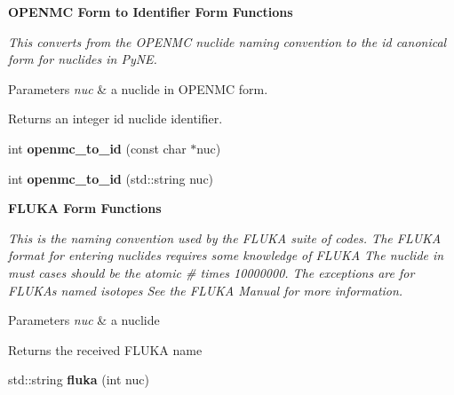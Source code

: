 \begin{Indent}\textbf{ O\+P\+E\+N\+MC Form to Identifier Form Functions}\par
{\em This converts from the O\+P\+E\+N\+MC nuclide naming convention to the id canonical form for nuclides in Py\+NE. 
\begin{DoxyParams}{Parameters}
{\em nuc} & a nuclide in O\+P\+E\+N\+MC form. \\
\hline
\end{DoxyParams}
\begin{DoxyReturn}{Returns}
an integer id nuclide identifier. 
\end{DoxyReturn}
}\begin{DoxyCompactItemize}
\item 
\mbox{\label{namespacepyne_1_1nucname_a716f20f33139efd693be4c8f394fbaa1}} 
int {\bfseries openmc\+\_\+to\+\_\+id} (const char $\ast$nuc)
\item 
\mbox{\label{namespacepyne_1_1nucname_a74d4da409e380e2bf13e36e26eff433a}} 
int {\bfseries openmc\+\_\+to\+\_\+id} (std\+::string nuc)
\end{DoxyCompactItemize}
\end{Indent}
\begin{Indent}\textbf{ F\+L\+U\+KA Form Functions}\par
{\em This is the naming convention used by the F\+L\+U\+KA suite of codes. The F\+L\+U\+KA format for entering nuclides requires some knowledge of F\+L\+U\+KA The nuclide in must cases should be the atomic \# times 10000000. The exceptions are for F\+L\+U\+KA\textquotesingle{}s named isotopes See the F\+L\+U\+KA Manual for more information. 
\begin{DoxyParams}{Parameters}
{\em nuc} & a nuclide \\
\hline
\end{DoxyParams}
\begin{DoxyReturn}{Returns}
the received F\+L\+U\+KA name 
\end{DoxyReturn}
}\begin{DoxyCompactItemize}
\item 
\mbox{\label{namespacepyne_1_1nucname_ac34443f2c05ca8fda7d7993e715a3f5a}} 
std\+::string {\bfseries fluka} (int nuc)
\end{DoxyCompactItemize}
\end{Indent}
